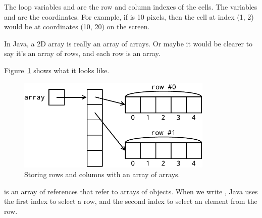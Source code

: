 The loop variables  and  are the row and column indexes of the cells.
The variables  and  are the coordinates.
For example, if  is 10 pixels, then the cell at index (1, 2) would be at coordinates (10, 20) on the screen.

In Java, a 2D array is really an array of arrays.
Or maybe it would be clearer to say it's an array of rows, and each row is an array.

%
%
%

Figure~\ref{fig:2D-array} shows what it looks like.

\begin{figure}[!ht]
\begin{center}
\includegraphics[width=265pt]{figs/2D-array.pdf}
\caption{Storing rows and columns with an array of arrays.}
\label{fig:2D-array}
\end{center}
\end{figure}

 is an array of references that refer to arrays of  objects.
When we write , Java uses the first index to select a row, and the second index to select an element from the row.

